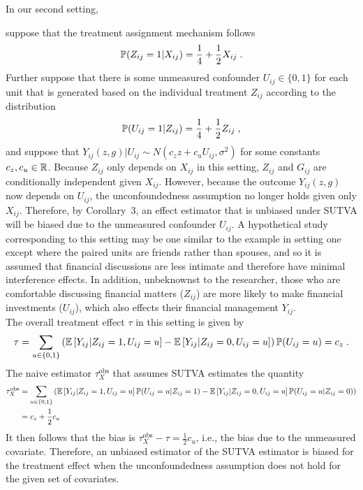 \documentclass[10pt]{article}
\begin{document}
In our second setting,
\iffalse
suppose that the covariates are jointly generated according to the distribution
\[
\P(X_{i1}=x_1,X_{i2}=x_2) =
\begin{cases}
\frac{3}{8} & \text{for }x_1=x_2 \\
\frac{1}{8} & \text{for }x_1\neq x_2
\end{cases} \;,
\]
i.e., a homophily situation where the units are more likely to be paired with another unit that has similar characteristics. Further
\fi
suppose that the treatment assignment mechanism follows
\[
\P(Z_{ij}=1|X_{ij}) = \frac{1}{4} + \frac{1}{2}X_{ij} \;.
\]
Further suppose that there is some unmeasured confounder $U_{ij}\in\{0,1\}$ for each unit that is generated based on the individual treatment $Z_{ij}$ according to the distribution
\[
\P(U_{ij}=1|Z_{ij}) = \frac{1}{4} + \frac{1}{2}Z_{ij}\;,
\]
and suppose that $Y_{ij}(z,g)|U_{ij}\sim N(c_zz+c_uU_{ij},\sigma^2)$ for some constants $c_z,c_u\in\bbR$. Because $Z_{ij}$ only depends on $X_{ij}$ in this setting, $Z_{ij}$ and $G_{ij}$ are conditionally independent given $X_{ij}$. However, because the outcome $Y_{ij}(z,g)$ now depends on $U_{ij}$, the unconfoundedness assumption no longer holds given only $X_{ij}$. Therefore, by Corollary~3, an effect estimator that is unbiased under SUTVA will be biased due to the unmeasured confounder $U_{ij}$. A hypothetical study corresponding to this setting may be one similar to the example in setting one except where the paired units are friends rather than spouses, and so it is assumed that financial discussions are less intimate and therefore have minimal interference effects. In addition, unbeknownst to the researcher, those who are comfortable discussing financial matters ($Z_{ij}$) are more likely to make financial investments ($U_{ij}$), which also effects their financial management $Y_{ij}$.
\\


The overall treatment effect $\tau$ in this setting is given by
\[
\tau = \sum_{u\in\{0,1\}}\left(\E\left[Y_{ij}|Z_{ij}=1,U_{ij}=u\right] - \E\left[Y_{ij}|Z_{ij}=0,U_{ij}=u\right]\right)\P(U_{ij}=u) = c_z \;.
\]
The naive estimator $\tau_{X}^\text{obs}$ that assumes SUTVA estimates the quantity
\begin{align*}
\tau_{X}^\text{obs} &= \sum_{u\in\{0,1\}}\left(\E\left[Y_{ij}|Z_{ij}=1,U_{ij}=u\right]\P(U_{ij}=u|Z_{ij}=1) - \E\left[Y_{ij}|Z_{ij}=0,U_{ij}=u\right]\P(U_{ij}=u|Z_{ij}=0)\right) \\
&= c_z + \frac{1}{2}c_u
\end{align*}
It then follows that the bias is $\tau_{X}^\text{obs} - \tau = \frac{1}{2}c_u$, i.e., the bias due to the unmeasured covariate. Therefore, an unbiased estimator of the SUTVA estimator is biased for the treatment effect when the unconfoundedness assumption does not hold for the given set of covariates.
\\
\end{document}
